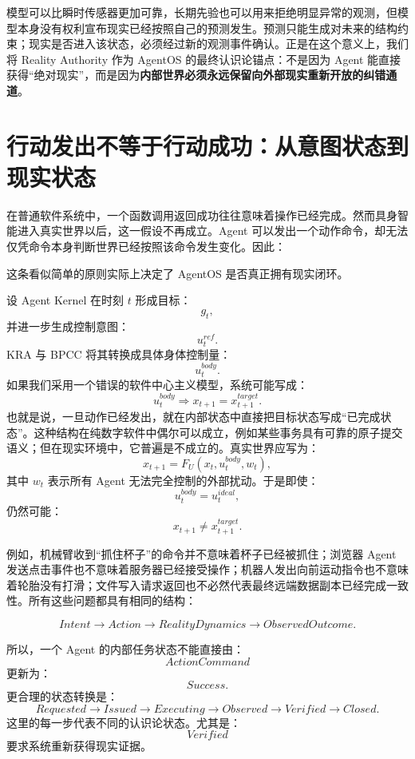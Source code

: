 \begin{statementbox}
\centering
{}
\end{statementbox}

模型可以比瞬时传感器更加可靠，长期先验也可以用来拒绝明显异常的观测，但模型本身没有权利宣布现实已经按照自己的预测发生。预测只能生成对未来的结构约束；现实是否进入该状态，必须经过新的观测事件确认。正是在这个意义上，我们将 Reality Authority 作为 AgentOS 的最终认识论锚点：不是因为 Agent 能直接获得``绝对现实''，而是因为\textbf{内部世界必须永远保留向外部现实重新开放的纠错通道}。

\section{行动发出不等于行动成功：从意图状态到现实状态}

在普通软件系统中，一个函数调用返回成功往往意味着操作已经完成。然而具身智能进入真实世界以后，这一假设不再成立。Agent 可以发出一个动作命令，却无法仅凭命令本身判断世界已经按照该命令发生变化。因此：
\begin{statementbox}
\centering
{}
\end{statementbox}
这条看似简单的原则实际上决定了 AgentOS 是否真正拥有现实闭环。

设 Agent Kernel 在时刻 $t$ 形成目标：
\[
g_t,
\]
并进一步生成控制意图：
\[
u_t^{ref}.
\]
KRA 与 BPCC 将其转换成具体身体控制量：
\[
u_t^{body}.
\]
如果我们采用一个错误的软件中心主义模型，系统可能写成：
\[
u_t^{body}
\Rightarrow
x_{t+1}=x^{target}_{t+1}.
\]
也就是说，一旦动作已经发出，就在内部状态中直接把目标状态写成``已完成状态''。这种结构在纯数字软件中偶尔可以成立，例如某些事务具有可靠的原子提交语义；但在现实环境中，它普遍是不成立的。真实世界应写为：
\[
x_{t+1}
=
F_U
\left(
x_t,
u_t^{body},
w_t
\right),
\]
其中 $w_t$ 表示所有 Agent 无法完全控制的外部扰动。于是即使：
\[
u_t^{body}=u_t^{ideal},
\]
仍然可能：
\[
x_{t+1}\neq x^{target}_{t+1}.
\]

例如，机械臂收到``抓住杯子''的命令并不意味着杯子已经被抓住；浏览器 Agent 发送点击事件也不意味着服务器已经接受操作；机器人发出向前运动指令也不意味着轮胎没有打滑；文件写入请求返回也不必然代表最终远端数据副本已经完成一致性。所有这些问题都具有相同的结构：

\[
Intent
\rightarrow
Action
\rightarrow
RealityDynamics
\rightarrow
ObservedOutcome.
\]

所以，一个 Agent 的内部任务状态不能直接由：
\[
ActionCommand
\]
更新为：
\[
Success.
\]
更合理的状态转换是：
\[
Requested
\rightarrow
Issued
\rightarrow
Executing
\rightarrow
Observed
\rightarrow
Verified
\rightarrow
Closed.
\]
这里的每一步代表不同的认识论状态。尤其是：
\[
Verified
\]
要求系统重新获得现实证据。


